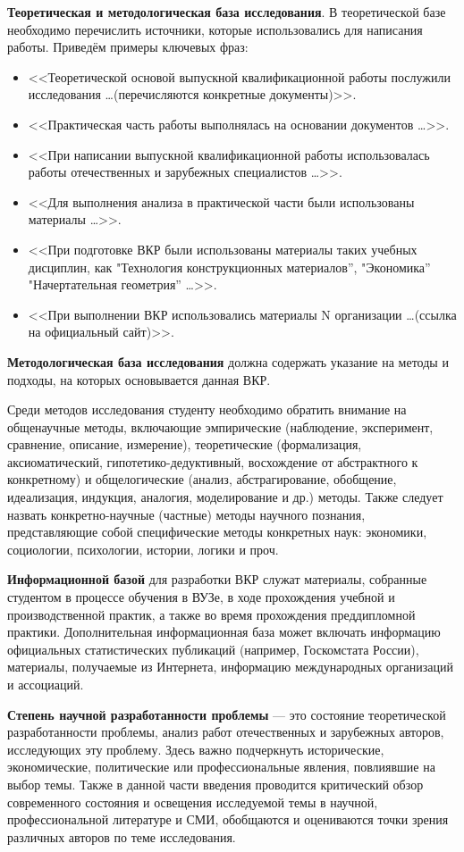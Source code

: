 \textbf{Теоретическая и методологическая база исследования}. В теоретической базе необходимо перечислить источники, которые использовались для написания работы. Приведём примеры ключевых фраз: 
\begin{itemize}
	\item <<Теоретической основой выпускной квалификационной работы послужили исследования  \ldots (перечисляются конкретные документы)>>.
	\item <<Практическая часть работы выполнялась на основании документов  \ldots>>.
	\item  <<При написании выпускной квалификационной работы использовалась работы отечественных и зарубежных специалистов \ldots>>.
	\item  <<Для выполнения анализа в практической части были использованы материалы  \ldots>>.
	\item <<При подготовке ВКР были использованы материалы таких учебных дисциплин, как "Технология конструкционных материалов'', "Экономика'' "Начертательная геометрия'' \ldots>>.
	\item <<При выполнении ВКР использовались материалы N организации \ldots (ссылка на официальный сайт)>>.
\end{itemize}

\textbf{Методологическая база исследования} должна содержать указание на методы и подходы, на которых основывается данная ВКР. 

Среди методов исследования студенту необходимо обратить внимание на общенаучные методы, включающие эмпирические (наблюдение, эксперимент, сравнение, описание, измерение), теоретические (формализация, аксиоматический, гипотетико-дедуктивный, восхождение от абстрактного к конкретному) и общелогические (анализ, абстрагирование, обобщение, идеализация, индукция, аналогия, моделирование и др.) методы.
Также следует назвать конкретно-научные (частные) методы научного познания, представляющие собой специфические методы конкретных наук: экономики, социологии, психологии, истории, логики и проч.

\textbf{Информационной базой} для разработки ВКР служат материалы, собранные студентом в процессе обучения в ВУЗе, в ходе прохождения учебной и производственной практик, а также во время прохождения преддипломной практики.
Дополнительная информационная база может включать информацию официальных статистических публикаций (например, Госкомстата России), материалы, получаемые из Интернета, информацию международных организаций и ассоциаций. 

\textbf{Степень научной разработанности проблемы} --- это состояние теоретической разработанности проблемы, анализ работ отечественных и зарубежных авторов, исследующих эту проблему. Здесь важно подчеркнуть исторические, экономические, политические или профессиональные явления, повлиявшие на выбор темы. Также в данной части введения проводится критический обзор современного состояния и освещения исследуемой темы в научной, профессиональной литературе и СМИ, обобщаются и оцениваются точки зрения различных авторов по теме исследования. 

